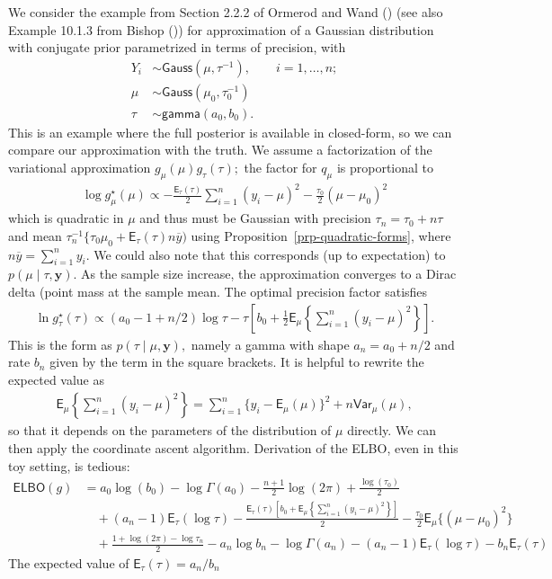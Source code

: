 \documentclass[
  11pt,
  letterpaper,
]{scrbook}
\theoremstyle{definition}
\theoremstyle{definition}
\theoremstyle{definition}
\theoremstyle{plain}
\theoremstyle{plain}
\theoremstyle{plain}
\theoremstyle{remark}
\begin{document}
We consider the example from Section 2.2.2 of Ormerod and Wand
() (see also Example 10.1.3 from
Bishop ()) for approximation of a
Gaussian distribution with conjugate prior parametrized in terms of
precision, with \begin{align*}
Y_i &\sim \mathsf{Gauss}(\mu, \tau^{-1}), \qquad i =1, \ldots, n;\\
\mu &\sim \mathsf{Gauss}(\mu_0, \tau_0^{-1}) \\
\tau &\sim \mathsf{gamma}(a_0, b_0).
\end{align*} This is an example where the full posterior is available in
closed-form, so we can compare our approximation with the truth. We
assume a factorization of the variational approximation
\(g_\mu(\mu)g_\tau(\tau);\) the factor for \(q_\mu\) is proportional to
\begin{align*}
 \log g^{\star}_\mu(\mu) \propto -\frac{\mathsf{E}_{\tau}(\tau)}{2} \sum_{i=1}^n (y_i-\mu)^2-\frac{\tau_0}{2}(\mu-\mu_0)^2
\end{align*} which is quadratic in \(\mu\) and thus must be Gaussian
with precision \(\tau_n = \tau_0 + n\tau\) and mean
\(\tau_n^{-1}\{\tau_0\mu_0 + \mathsf{E}_{\tau}(\tau)n\overline{y})\)
using Proposition~\ref{prp-quadratic-forms}, where
\(n\overline{y} = \sum_{i=1}^n y_i.\) We could also note that this
corresponds (up to expectation) to \(p(\mu \mid \tau, \boldsymbol{y}).\)
As the sample size increase, the approximation converges to a Dirac
delta (point mass at the sample mean. The optimal precision factor
satisfies \begin{align*}
 \ln g^{\star}_{\tau}(\tau) \propto (a_0-1 +n/2) \log \tau - \tau \left[b_0  + \frac{1}{2} \mathsf{E}_{\mu}\left\{\sum_{i=1}^n (y_i-\mu)^2\right\}\right].
\end{align*} This is the form as \(p(\tau \mid \mu, \boldsymbol{y}),\)
namely a gamma with shape \(a_n =a_0 +n/2\) and rate \(b_n\) given by
the term in the square brackets. It is helpful to rewrite the expected
value as \begin{align*}
 \mathsf{E}_{\mu}\left\{\sum_{i=1}^n (y_i-\mu)^2\right\} = \sum_{i=1}^n \{y_i - \mathsf{E}_{\mu}(\mu)\}^2 + n \mathsf{Var}_{\mu}(\mu),
\end{align*} so that it depends on the parameters of the distribution of
\(\mu\) directly. We can then apply the coordinate ascent algorithm.
Derivation of the ELBO, even in this toy setting, is tedious:
\begin{align*}
\mathsf{ELBO}(g) & = a_0\log(b_0)-\log \Gamma(a_0) - \frac{n+1}{2} \log(2\pi) + \frac{\log(\tau_0)}{2} \\&\quad+ (a_n-1)\mathsf{E}_{\tau}(\log \tau) -
\frac{ \mathsf{E}_{\tau}(\tau)\left[b_0 +\mathsf{E}_{\mu}\left\{\sum_{i=1}^n (y_i - \mu)^2\right\}\right]}{2} - \frac{\tau_0}{2} \mathsf{E}_{\mu}\{(\mu - \mu_0)^2\}\\& \quad + \frac{1+\log(2\pi)-\log\tau_n}{2} -a_n\log b_n - \log \Gamma(a_n) - (a_n-1)\mathsf{E}_{\tau}(\log \tau) -b_n \mathsf{E}_{\tau}(\tau)
\end{align*} The expected value of \(\mathsf{E}_{\tau}(\tau) = a_n/b_n\)
\end{document}
